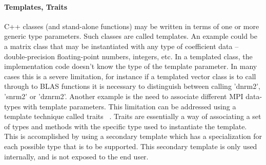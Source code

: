 \documentclass[12pt,relax]{SANDreport}
\begin{document}
\paragraph{Templates, Traits}
C++ classes (and stand-alone functions) may be written in terms of one or more
generic type parameters. Such classes are called templates. An example could be
a matrix class that may be instantiated with any type of coefficient data --
double-precision floating-point numbers, integers, etc. In a templated class,
the implementation code doesn't know the type of the template parameter. In
many cases this is a severe limitation, for instance if a templated vector
class is to call through to BLAS functions it is necessary to distinguish
between calling 'dnrm2', 'snrm2' or 'dznrm2'. Another example is the need to
associate different MPI data-types with template parameters. This limitation
can be addressed using a template technique called traits ~\cite{MyersTraits}.
Traits are essentially a way of associating a set of types and methods with
the specific type used to instantiate the template. This is accomplished by
using a secondary template which has a specialization for each possible type
that is to be supported. This secondary template is only used internally, and
is not exposed to the end user.


    \begin{SANDdistribution}
	\bigskip




    \end{SANDdistribution}
\end{document}
